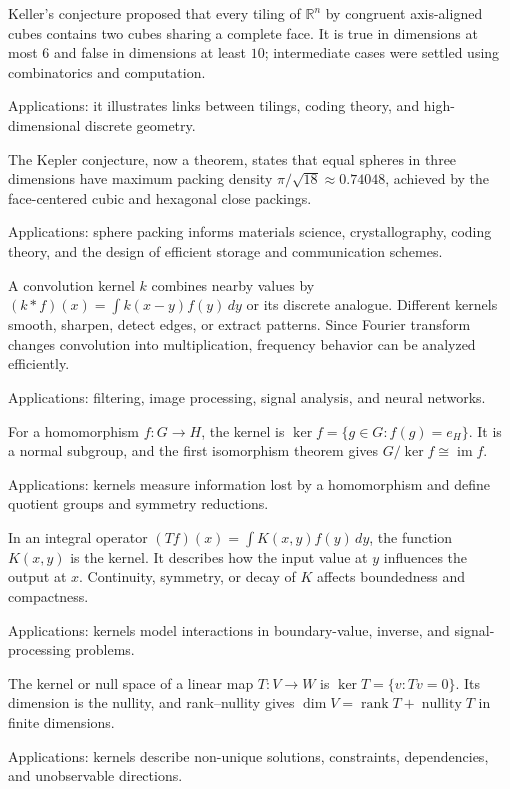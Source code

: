 Keller's conjecture proposed that every tiling of $\mathbb R^n$ by congruent axis-aligned cubes contains two cubes sharing a complete face. It is true in dimensions at most $6$ and false in dimensions at least $10$; intermediate cases were settled using combinatorics and computation. \par\noindent Applications: it illustrates links between tilings, coding theory, and high-dimensional discrete geometry.

The Kepler conjecture, now a theorem, states that equal spheres in three dimensions have maximum packing density $\pi/\sqrt{18}\approx0.74048$, achieved by the face-centered cubic and hexagonal close packings. \par\noindent Applications: sphere packing informs materials science, crystallography, coding theory, and the design of efficient storage and communication schemes.

A convolution kernel $k$ combines nearby values by $(k*f)(x)=\int k(x-y)f(y)\,dy$ or its discrete analogue. Different kernels smooth, sharpen, detect edges, or extract patterns. Since Fourier transform changes convolution into multiplication, frequency behavior can be analyzed efficiently. \par\noindent Applications: filtering, image processing, signal analysis, and neural networks.

For a homomorphism $f:G\to H$, the kernel is $\ker f=\{g\in G:f(g)=e_H\}$. It is a normal subgroup, and the first isomorphism theorem gives $G/\ker f\cong\operatorname{im}f$. \par\noindent Applications: kernels measure information lost by a homomorphism and define quotient groups and symmetry reductions.

In an integral operator $(Tf)(x)=\int K(x,y)f(y)\,dy$, the function $K(x,y)$ is the kernel. It describes how the input value at $y$ influences the output at $x$. Continuity, symmetry, or decay of $K$ affects boundedness and compactness. \par\noindent Applications: kernels model interactions in boundary-value, inverse, and signal-processing problems.

The kernel or null space of a linear map $T:V\to W$ is $\ker T=\{v:T v=0\}$. Its dimension is the nullity, and rank--nullity gives $\dim V=\operatorname{rank}T+\operatorname{nullity}T$ in finite dimensions. \par\noindent Applications: kernels describe non-unique solutions, constraints, dependencies, and unobservable directions.

